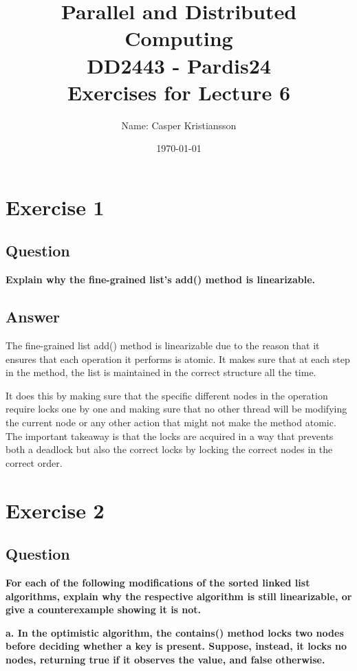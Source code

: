 \documentclass{article}
\title{\textbf{Parallel and Distributed Computing\\DD2443 - Pardis24\\Exercises for Lecture 6}}
\author{Name: Casper Kristiansson}
\date{\today}
\begin{document}
\setlength\parindent{0pt}
\setlength{\parskip}{\bigskipamount}

\maketitle

\section*{Exercise 1}
\subsection*{Question}
\textbf{Explain why the fine-grained list’s add() method is linearizable.}

\subsection*{Answer}
The fine-grained list add() method is linearizable due to the reason that it ensures that each operation it performs is atomic. It makes sure that at each step in the method, the list is maintained in the correct structure all the time.

It does this by making sure that the specific different nodes in the operation require locks one by one and making sure that no other thread will be modifying the current node or any other action that might not make the method atomic. The important takeaway is that the locks are acquired in a way that prevents both a deadlock but also the correct locks by locking the correct nodes in the correct order.





\section*{Exercise 2}
\subsection*{Question}
\textbf{For each of the following modifications of the sorted linked list algorithms, explain why the respective algorithm is still linearizable, or give a counterexample showing it is not.}

\textbf{a. In the optimistic algorithm, the contains() method locks two nodes before deciding whether a key is present. Suppose, instead, it locks no nodes, returning true if it observes the value, and false otherwise.}
\end{document}
